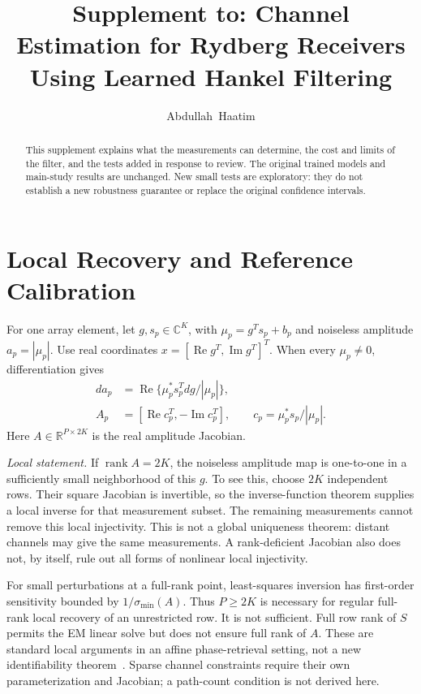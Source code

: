 \documentclass[journal]{IEEEtran}
\newcommand{\R}{\mathbb R}
\DeclareMathOperator{\rank}{rank}
\begin{document}
\title{Supplement to: Channel Estimation for Rydberg Receivers Using Learned Hankel Filtering}
\author{Abdullah~Haatim}
\maketitle
\begin{abstract}
This supplement explains what the measurements can determine, the cost
and limits of the filter, and the tests added in response to review. The
original trained models and main-study results are unchanged. New small
tests are exploratory: they do not establish a new robustness guarantee
or replace the original confidence intervals.
\end{abstract}

\section{Local Recovery and Reference Calibration}
For one array element, let $g,s_p\in\mathbb C^K$, with
$\mu_p=g^Ts_p+b_p$ and noiseless amplitude $a_p=|\mu_p|$.
Use real coordinates $x=[\operatorname{Re}g^T,\operatorname{Im}g^T]^T$.
When every $\mu_p\ne0$, differentiation gives
\begin{align}
 da_p&=\operatorname{Re}\{\mu_p^*s_p^T dg/|\mu_p|\},\\
 A_p&=[\operatorname{Re}c_p^T,-\operatorname{Im}c_p^T],\qquad
 c_p=\mu_p^*s_p/|\mu_p|.
\end{align}
Here $A\in\R^{P\times2K}$ is the real amplitude Jacobian.

\textit{Local statement.} If $\rank A=2K$, the noiseless amplitude map
is one-to-one in a sufficiently small neighborhood of this $g$.
To see this, choose $2K$ independent rows. Their square Jacobian is
invertible, so the inverse-function theorem supplies a local inverse for
that measurement subset. The remaining measurements cannot remove this
local injectivity. This is not a global uniqueness theorem: distant
channels may give the same measurements. A rank-deficient Jacobian also
does not, by itself, rule out all forms of nonlinear local injectivity.

For small perturbations at a full-rank point, least-squares inversion has
first-order sensitivity bounded by $1/\sigma_{\min}(A)$.
Thus $P\ge2K$ is necessary for regular full-rank local recovery of an
unrestricted row. It is not sufficient. Full row rank of $S$ permits
the EM linear solve but does not ensure full rank of $A$. These are
standard local arguments in an affine phase-retrieval setting, not a new
identifiability theorem~\cite{gao2018}. Sparse channel constraints require their own
parameterization and Jacobian; a path-count condition is not derived here.
\end{document}

